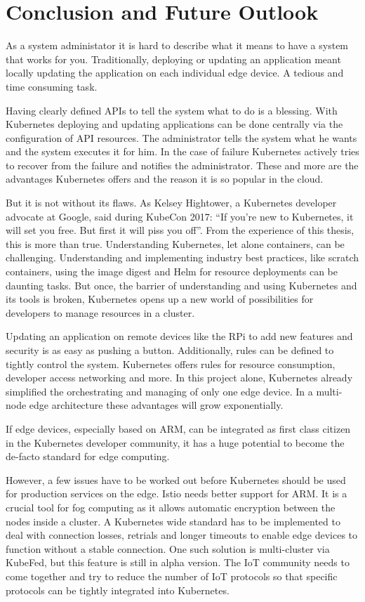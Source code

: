 \clearpage
\section{Conclusion and Future Outlook}
As a system administator it is hard to describe what it means to have a system that works for you. Traditionally, deploying or updating an application meant locally updating the application on each individual edge device. A tedious and time consuming task.

Having clearly defined APIs to tell the system what to do is a blessing. With Kubernetes deploying and updating applications can be done centrally via the configuration of API resources. The administrator tells the system what he wants and the system executes it for him. In the case of failure Kubernetes actively tries to recover from the failure and notifies the administrator. These and more are the advantages Kubernetes offers and the reason it is so popular in the cloud.

But it is not without its flaws. As Kelsey Hightower, a Kubernetes developer advocate at Google, said during KubeCon 2017: ``If you’re new to Kubernetes, it will set you free. But first it will piss you off''\cite{KubernetesPissYouOff:online}. From the experience of this thesis, this is more than true. Understanding Kubernetes, let alone containers, can be challenging. Understanding and implementing industry best practices, like scratch containers, using the image digest and Helm for resource deployments can be daunting tasks. But once, the barrier of understanding and using Kubernetes and its tools is broken, Kubernetes opens up a new world of possibilities for developers to manage resources in a cluster.

Updating an application on remote devices like the RPi to add new features and security is as easy as pushing a button. Additionally, rules can be defined to tightly control the system. Kubernetes offers rules for resource consumption, developer access networking and more. In this project alone, Kubernetes already simplified the orchestrating and managing of only one edge device. In a multi-node edge architecture these advantages will grow exponentially.

If edge devices, especially based on ARM, can be integrated as first class citizen in the Kubernetes developer community, it has a huge potential to become the de-facto standard for edge computing.

However, a few issues have to be worked out before Kubernetes should be used for production services on the edge. Istio needs better support for ARM. It is a crucial tool for fog computing as it allows automatic encryption between the nodes inside a cluster. A Kubernetes wide standard has to be implemented to deal with connection losses, retrials and longer timeouts to enable edge devices to function without a stable connection. One such solution is multi-cluster via KubeFed, but this feature is still in alpha version. The IoT community needs to come together and try to reduce the number of IoT protocols so that specific protocols can be tightly integrated into Kubernetes.  

